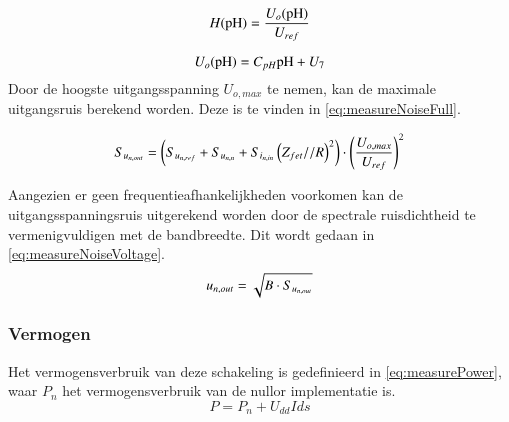 \begin{equation}
    H(\mathrm{pH}) = \frac{U_o(\mathrm{pH})}{U_{ref}}
    \label{eq:measureTransfer}
\end{equation}

\begin{equation}\label{eq:measureOutVoltage}
    U_o(\ph) = C_{pH}\ph + U_7
    \tagaddtext{[\si{\volt}]}
\end{equation}
Door de hoogste uitgangsspanning $U_{o,max}$ te nemen, kan de maximale uitgangsruis berekend worden. Deze is te vinden in \cref{eq:measureNoiseFull}.

\begin{equation}\label{eq:measureNoiseFull}
    S_{u_{{n,out}}} = \left(S_{u_{{n,ref}}} + S_{u_{{n,n}}} + S_{i_{{n,in}}}\left(Z_{fet} // R\right)^2\right) \cdot \left(\frac{U_{o,max}}{U_{ref}}\right)^2
    \tagaddtext{[\si{\volt\squared\per\hertz}]}
\end{equation}

Aangezien er geen frequentieafhankelijkheden voorkomen kan de uitgangsspanningsruis uitgerekend worden door de spectrale ruisdichtheid te vermenigvuldigen met de bandbreedte. Dit wordt gedaan in \cref{eq:measureNoiseVoltage}.
\begin{equation}\label{eq:measureNoiseVoltage}
    u_{n,out} = \sqrt{B \cdot S_{u_{{n,out}}}}
    \tagaddtext{[\si{\volt}]}
\end{equation}

\subsubsection{Vermogen}
Het vermogensverbruik van deze schakeling is gedefinieerd in \cref{eq:measurePower}, waar $P_n$ het vermogensverbruik van de nullor implementatie is. 
\begin{equation}\label{eq:measurePower}
    P = P_n + U_{dd}I{ds}
\end{equation}

